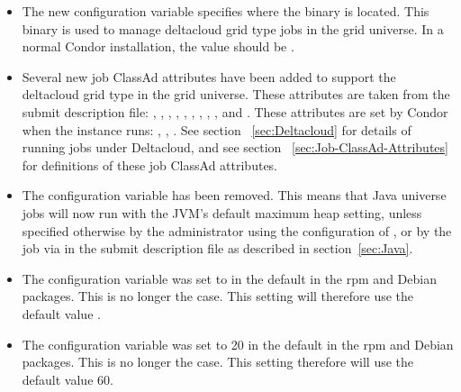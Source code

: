 \begin{itemize}

\item The new configuration variable  specifies
where the  binary is located. This binary is used to
manage deltacloud grid type jobs in the grid universe.
In a normal Condor installation, the value should be
.

\item Several new job ClassAd attributes have been added to support
the deltacloud grid type in the grid universe.
These attributes are taken from the submit description file:
,
,
,
,
,
,
,
,
, and
.
These attributes are set by Condor when the instance runs:
,
,
.
See section ~\ref{sec:Deltacloud} for details of running jobs under
Deltacloud, and see section ~\ref{sec:Job-ClassAd-Attributes}
for definitions of these job ClassAd attributes.

\item The configuration variable  
  has been removed. 
  This means that Java universe jobs will now run with the JVM's 
  default maximum heap setting,
  unless specified otherwise by the administrator using the configuration
  of ,
  or by the job via 
   in the submit description file
  as described in section~\ref{sec:Java}.

\item The configuration variable 
  was set to  in the default 
  in the rpm and Debian packages.  This is no longer the case.
  This setting will therefore use the default value .

\item The configuration variable  was set
  to 20 in the default  in the rpm and
  Debian packages.  This is no longer the case.  This setting
  therefore will use the default value 60.

\end{itemize}

